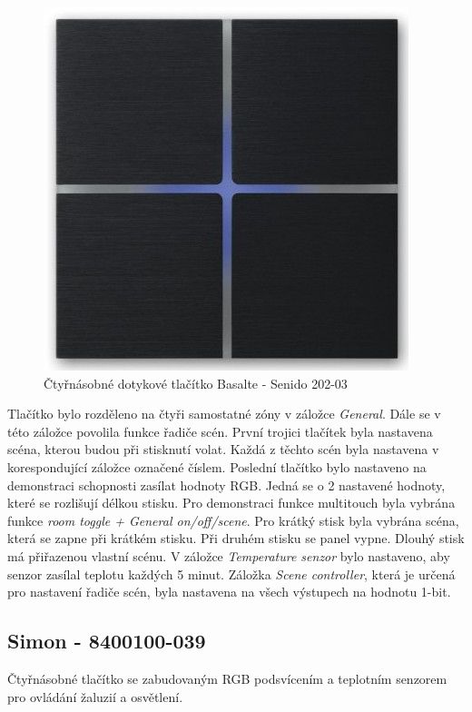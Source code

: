 \begin{figure}[!ht]
  \begin{center}
    \includegraphics[scale=0.4]{obrazky/Basalte.jpg}
  \end{center}
  \caption[Čtyřnásobné dotykové tlačítko Basalte - Senido 202-03 \cite{Basalte}]{Čtyřnásobné dotykové tlačítko Basalte - Senido 202-03 \cite{Basalte}}
  \label{fig:Čtyřnásobné dotykové tlačítko Basalte - Senido 202-03}
\end{figure}

Tlačítko bylo rozděleno na čtyři samostatné zóny v záložce \textit{General}. Dále se v této záložce povolila funkce řadiče scén. První trojici tlačítek byla nastavena scéna, kterou budou při stisknutí volat.  Každá z těchto scén byla nastavena v korespondující záložce označené číslem. Poslední tlačítko bylo nastaveno na demonstraci schopnosti zasílat hodnoty RGB. Jedná se o 2 nastavené hodnoty, které se rozlišují délkou stisku. Pro demonstraci funkce multitouch byla vybrána funkce \textit{room toggle + General on/off/scene}. Pro krátký stisk byla vybrána scéna, která se zapne při krátkém stisku. Při druhém stisku se panel vypne. Dlouhý stisk má přiřazenou vlastní scénu. V záložce \textit{Temperature senzor} bylo nastaveno, aby senzor zasílal teplotu každých 5 minut. Záložka \textit{Scene controller}, která je určená pro nastavení řadiče scén, byla nastavena na všech výstupech na hodnotu 1-bit.

\subsection{Simon - 8400100-039}
Čtyřnásobné tlačítko se zabudovaným RGB podsvícením a teplotním senzorem pro ovládání žaluzií a osvětlení. \cite{Simon}

